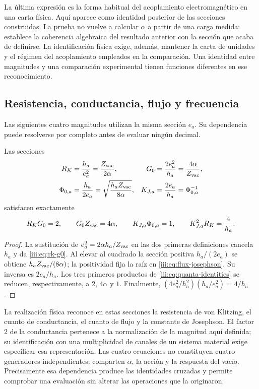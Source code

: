 La última expresión es la forma habitual del acoplamiento electromagnético
en una carta física. Aquí aparece como identidad posterior de las secciones
construidas. La prueba no vuelve a calcular $\alpha$ a partir de una carga
medida: establece la coherencia algebraica del resultado anterior con la
sección que acaba de definirse. La identificación física exige, además,
mantener la carta de unidades y el régimen del acoplamiento empleados en la
comparación. Una identidad entre magnitudes y una comparación experimental
tienen funciones diferentes en ese reconocimiento.

\subsection{Resistencia, conductancia, flujo y frecuencia}

Las siguientes cuatro magnitudes utilizan la misma sección $e_a$. Su
dependencia puede resolverse por completo antes de evaluar ningún decimal.

\begin{theorem}
Las secciones
\begin{align}
 R_K&=\frac{h_a}{e_a^2}=\frac{Z_{\rm vac}}{2\alpha},
 &G_0&=\frac{2e_a^2}{h_a}=\frac{4\alpha}{Z_{\rm vac}},
 \label{iii:eq:rk-g0}\\
 \Phi_{0,a}&=\frac{h_a}{2e_a}
 =\sqrt{\frac{h_aZ_{\rm vac}}{8\alpha}},
 &K_{J,a}&=\frac{2e_a}{h_a}=\Phi_{0,a}^{-1}
 \label{iii:eq:flux-josephson}
\end{align}
satisfacen exactamente
\begin{equation}
 R_KG_0=2,\qquad G_0Z_{\rm vac}=4\alpha,\qquad
 K_{J,a}\Phi_{0,a}=1,\qquad
 K_{J,a}^{2}R_K=\frac4{h_a}.
 \label{iii:eq:quanta-identities}
\end{equation}
\end{theorem}
\begin{proof}
La sustitución de $e_a^2=2\alpha h_a/Z_{\rm vac}$ en las dos primeras
definiciones cancela $h_a$ y da \eqref{iii:eq:rk-g0}. Al elevar al
cuadrado la sección positiva $h_a/(2e_a)$ se obtiene
$h_aZ_{\rm vac}/(8\alpha)$; la positividad fija la raíz en
\eqref{iii:eq:flux-josephson}. Su inversa es $2e_a/h_a$.
Los tres primeros productos de \eqref{iii:eq:quanta-identities} se
reducen, respectivamente, a $2$, $4\alpha$ y $1$. Finalmente,
$(4e_a^2/h_a^2)(h_a/e_a^2)=4/h_a$.
\end{proof}

La realización física reconoce en estas secciones la resistencia de von
Klitzing, el cuanto de conductancia, el cuanto de flujo y la constante de
Josephson. El factor $2$ de la conductancia pertenece a la normalización
de la magnitud aquí definida; su identificación con una multiplicidad de
canales de un sistema material exige especificar esa representación.
Las cuatro ecuaciones no constituyen cuatro generadores independientes:
comparten $\alpha$, la acción y la respuesta del vacío. Precisamente esa
dependencia produce las identidades cruzadas y permite comprobar una
evaluación sin alterar las operaciones que la originaron.

